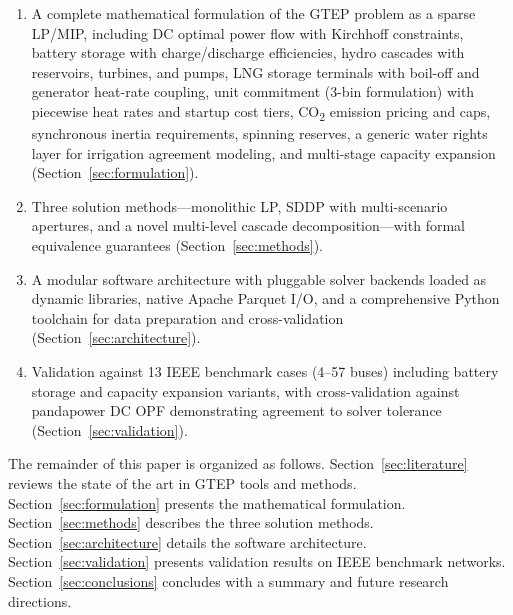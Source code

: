 \begin{enumerate}
  \item A complete mathematical formulation of the GTEP problem as a
    sparse LP/MIP, including DC optimal power flow with Kirchhoff
    constraints, battery storage with charge/discharge efficiencies,
    hydro cascades with reservoirs, turbines, and pumps, LNG storage
    terminals with boil-off and generator heat-rate coupling, unit
    commitment (3-bin formulation) with piecewise heat rates and startup
    cost tiers, CO\textsubscript{2} emission pricing and caps,
    synchronous inertia requirements, spinning reserves, a generic water
    rights layer for irrigation agreement modeling, and multi-stage
    capacity expansion
    (Section~\ref{sec:formulation}).

  \item Three solution methods---monolithic LP, SDDP with multi-scenario
    apertures, and a novel multi-level cascade decomposition---with
    formal equivalence guarantees
    (Section~\ref{sec:methods}).

  \item A modular software architecture with pluggable solver backends
    loaded as dynamic libraries, native Apache Parquet I/O, and a
    comprehensive Python toolchain for data preparation and
    cross-validation (Section~\ref{sec:architecture}).

  \item Validation against 13 IEEE benchmark cases (4--57 buses)
    including battery storage and capacity expansion variants, with
    cross-validation against pandapower DC OPF demonstrating agreement
    to solver tolerance (Section~\ref{sec:validation}).
\end{enumerate}

The remainder of this paper is organized as follows.
Section~\ref{sec:literature} reviews the state of the art in GTEP tools
and methods.  Section~\ref{sec:formulation} presents the mathematical
formulation.  Section~\ref{sec:methods} describes the three solution
methods.  Section~\ref{sec:architecture} details the software architecture.
Section~\ref{sec:validation} presents validation results on IEEE benchmark
networks.  Section~\ref{sec:conclusions} concludes with a summary and
future research directions.
